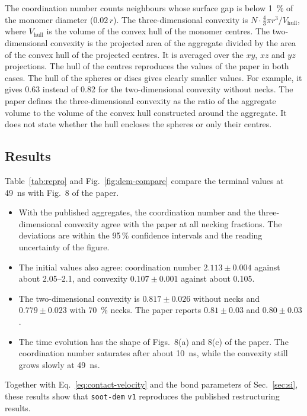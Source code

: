 \documentclass[11pt,a4paper]{article}
\begin{document}
The coordination number counts neighbours whose surface gap is below \SI{1}{\percent} of the monomer diameter ($0.02\,r$).
The three-dimensional convexity is $N \cdot \tfrac{4}{3}\pi r^3 / V_\text{hull}$, where $V_\text{hull}$ is the volume of the convex hull of the monomer centres.
The two-dimensional convexity is the projected area of the aggregate divided by the area of the convex hull of the projected centres.
It is averaged over the $xy$, $xz$ and $yz$ projections.
The hull of the centres reproduces the values of the paper in both cases.
The hull of the spheres or discs gives clearly smaller values.
For example, it gives 0.63 instead of 0.82 for the two-dimensional convexity without necks.
The paper defines the three-dimensional convexity as the ratio of the aggregate volume to the volume of the convex hull constructed around the aggregate.
It does not state whether the hull encloses the spheres or only their centres.

\subsection{Results}

Table~\ref{tab:repro} and Fig.~\ref{fig:dem-compare} compare the terminal values at \SI{49}{\nano\second} with Fig.~8 of the paper.
\begin{itemize}
  \item With the published aggregates, the coordination number and the three-dimensional convexity agree with the paper at all necking fractions.
        The deviations are within the 95\,\% confidence intervals and the reading uncertainty of the figure.
  \item The initial values also agree: coordination number $2.113 \pm 0.004$ against about 2.05--2.1, and convexity $0.107 \pm 0.001$ against about 0.105.
  \item The two-dimensional convexity is $0.817 \pm 0.026$ without necks and $0.779 \pm 0.023$ with \SI{70}{\percent} necks.
        The paper reports $0.81 \pm 0.03$ and $0.80 \pm 0.03$.
  \item The time evolution has the shape of Figs.~8(a) and 8(c) of the paper.
        The coordination number saturates after about \SI{10}{\nano\second}, while the convexity still grows slowly at \SI{49}{\nano\second}.
\end{itemize}
Together with Eq.~\eqref{eq:contact-velocity} and the bond parameters of Sec.~\ref{sec:si}, these results show that \texttt{soot-dem} \texttt{v1} reproduces the published restructuring results.
\end{document}
